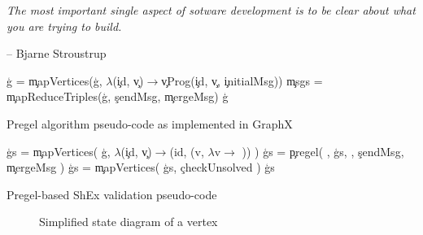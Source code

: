 \epigraph{\textit{The most important single aspect of sotware development is to be clear about what you are trying to build.}}{-- \textup{Bjarne Stroustrup}}

\begin{algorithm}[!hbt]
    \DontPrintSemicolon
    \SetAlgoVlined
    \blockskip
    \c{g} = \c{mapVertices}(\c{g}, $\lambda$(\c{id}, \c{v})$\rightarrow$\c{vProg}(\c{id}, \c{v}, \c{initialMsg}))  \;
    \c{msgs} = \c{mapReduceTriples}(\c{g}, \c{sendMsg}, \c{mergeMsg}) \;
    \Return\c{g}
    \caption{Pregel algorithm pseudo-code as implemented in GraphX}
\end{algorithm}

\begin{algorithm}[!hbt]
    \DontPrintSemicolon
    \SetAlgoVlined
    \blockskip
    \c{gs} = \c{mapVertices}( \c{g}, $\lambda$(\c{id}, \c{v})$\rightarrow$(id, (v, $\lambda$v$ \rightarrow$ \Undefined)) )  \;
    \c{gs} = \c{pregel}( \Validate, \c{gs}, \vProg, \c{sendMsg}, \c{mergeMsg} ) \;
    \c{gs} = \c{mapVertices}( \c{gs}, \c{checkUnsolved} ) \;
    \Return\c{gs} \;
    \blockskip
    \\
    \caption{Pregel-based ShEx validation pseudo-code}
    \label{alogorithm:PSchema}
\end{algorithm}

\begin{figure}[ht]
    \centering
    
    \caption[Simplified state diagram of a vertex]{Simplified state diagram of a vertex~\cite{10.1145/1807167.1807184}}
    \label{fig:pregelState}
\end{figure}
